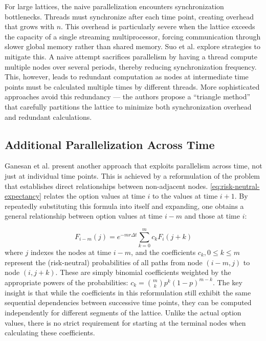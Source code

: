 \documentclass[english,12pt,a4paper,pdftex,sci,utf8]{aaltothesis}
\begin{document}
For large lattices, the naive parallelization encounters synchronization bottlenecks. Threads must synchronize after each time point, creating overhead that grows with $n$. This overhead is particularly severe when the lattice exceeds the capacity of a single streaming multiprocessor, forcing communication through slower global memory rather than shared memory. Suo et al. \cite{suo2015gpu} explore strategies to mitigate this. A naive attempt sacrifices parallelism by having a thread compute multiple nodes over several periods, thereby reducing synchronization frequency. This, however, leads to redundant computation as nodes at intermediate time points must be calculated multiple times by different threads. More sophisticated approaches avoid this redundancy --- the authors propose a ``triangle method'' that carefully partitions the lattice to minimize both synchronization overhead and redundant calculations.
\clearpage

\subsection{Additional Parallelization Across Time}
Ganesan et al. \cite{ganesan2009acceleration} present another approach that exploits parallelism across time, not just at individual time points. This is achieved by a reformulation of the problem that establishes direct relationships between non-adjacent nodes. \cref{eq:risk-neutral-expectancy} relates the option values at time $i$ to the values at time $i+1$. By repeatedly substituting this formula into itself and expanding, one obtains a general relationship between option values at time $i-m$ and those at time $i$:

\begin{equation}
    F_{i-m}(j) = e^{-m r \Delta t} \sum_{k=0}^m c_k F_i(j+k)
\label{eq:relative-prices}
\end{equation}
where $j$ indexes the nodes at time $i-m$, and the coefficients $c_k, 0 \leq k \leq m$ represent the (risk-neutral) probabilities of all paths from node $(i-m,j)$ to node $(i,j+k)$. These are simply binomial coefficients weighted by the appropriate powers of the probabilities: $c_k = \binom{m}{k}p^k(1-p)^{m-k}$. The key insight is that while the coefficients in this reformulation still exhibit the same sequential dependencies between successive time points, they can be computed independently for different segments of the lattice. Unlike the actual option values, there is no strict requirement for starting at the terminal nodes when calculating these coefficients.
\end{document}
